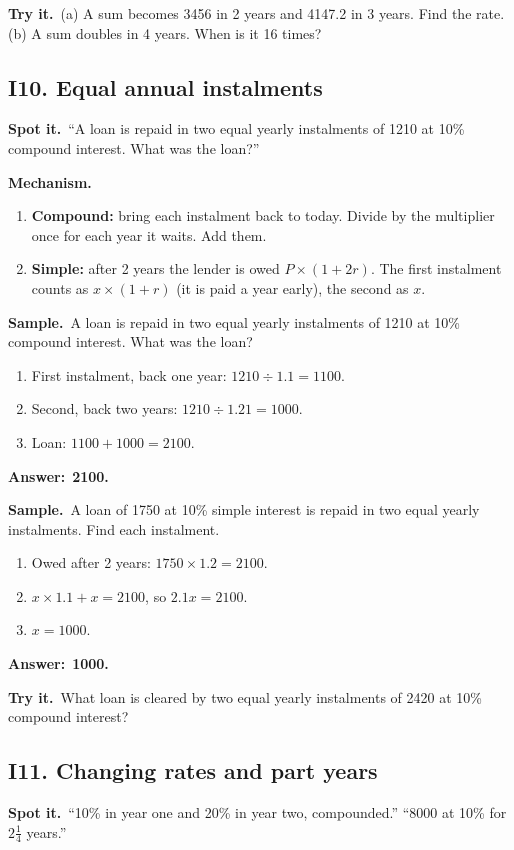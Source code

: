 \documentclass[11pt,a4paper]{article}
\let\oldsubsection\subsection
\renewcommand{\subsection}{\needspace{9\baselineskip}\oldsubsection}
\newcommand{\spot}{\textbf{\color{ember}Spot it.}\ }
\newcommand{\mech}{\textbf{\color{ember}Mechanism.}\ }
\newif\ifkeepsamp
\newcommand{\ans}[1]{\par\nopagebreak\noindent\textbf{\color{ember}Answer:}\ \textbf{#1}\par}
\newcommand{\samp}{\ifkeepsamp\needspace{4\baselineskip}\fi\textbf{\color{ember}Sample.}\ }
\newcommand{\tryit}[1]{\textbf{\color{ember}Try it.}\ #1}
\begin{document}
\tryit (a) A sum becomes 3456 in 2 years and 4147.2 in 3 years. Find the rate. (b) A sum doubles in 4 years. When is it 16 times?

\subsection{I10. Equal annual instalments}
\spot ``A loan is repaid in two equal yearly instalments of 1210 at 10\% compound interest. What was the loan?''

\mech
\begin{enumerate}
\item \textbf{Compound:} bring each instalment back to today. Divide by the multiplier once for each year it waits. Add them.
\item \textbf{Simple:} after 2 years the lender is owed $P \times (1 + 2r)$. The first instalment counts as $x \times (1 + r)$ (it is paid a year early), the second as $x$.
\end{enumerate}

\samp A loan is repaid in two equal yearly instalments of 1210 at 10\% compound interest. What was the loan?
\begin{enumerate}
\item First instalment, back one year: $1210 \div 1.1 = 1100$.
\item Second, back two years: $1210 \div 1.21 = 1000$.
\item Loan: $1100 + 1000 = 2100$.
\end{enumerate}
\ans{2100.}

\samp A loan of 1750 at 10\% simple interest is repaid in two equal yearly instalments. Find each instalment.
\begin{enumerate}
\item Owed after 2 years: $1750 \times 1.2 = 2100$.
\item $x \times 1.1 + x = 2100$, so $2.1x = 2100$.
\item $x = 1000$.
\end{enumerate}
\ans{1000.}

\tryit What loan is cleared by two equal yearly instalments of 2420 at 10\% compound interest?

\subsection{I11. Changing rates and part years}
\spot ``10\% in year one and 20\% in year two, compounded.'' ``8000 at 10\% for $2\tfrac14$ years.''
\end{document}

